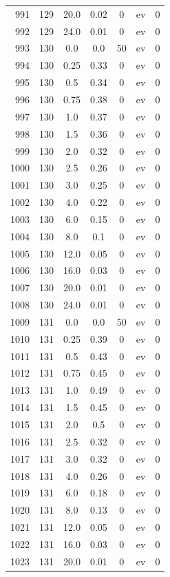 \documentclass[12pt,a4paper]{article}
\begin{document}
\begin{tabular}{r|cccccc}
	991 & 129 & 20.0 & 0.02 & 0 & ev & 0 \\
	992 & 129 & 24.0 & 0.01 & 0 & ev & 0 \\
	993 & 130 & 0.0 & 0.0 & 50 & ev & 0 \\
	994 & 130 & 0.25 & 0.33 & 0 & ev & 0 \\
	995 & 130 & 0.5 & 0.34 & 0 & ev & 0 \\
	996 & 130 & 0.75 & 0.38 & 0 & ev & 0 \\
	997 & 130 & 1.0 & 0.37 & 0 & ev & 0 \\
	998 & 130 & 1.5 & 0.36 & 0 & ev & 0 \\
	999 & 130 & 2.0 & 0.32 & 0 & ev & 0 \\
	1000 & 130 & 2.5 & 0.26 & 0 & ev & 0 \\
	1001 & 130 & 3.0 & 0.25 & 0 & ev & 0 \\
	1002 & 130 & 4.0 & 0.22 & 0 & ev & 0 \\
	1003 & 130 & 6.0 & 0.15 & 0 & ev & 0 \\
	1004 & 130 & 8.0 & 0.1 & 0 & ev & 0 \\
	1005 & 130 & 12.0 & 0.05 & 0 & ev & 0 \\
	1006 & 130 & 16.0 & 0.03 & 0 & ev & 0 \\
	1007 & 130 & 20.0 & 0.01 & 0 & ev & 0 \\
	1008 & 130 & 24.0 & 0.01 & 0 & ev & 0 \\
	1009 & 131 & 0.0 & 0.0 & 50 & ev & 0 \\
	1010 & 131 & 0.25 & 0.39 & 0 & ev & 0 \\
	1011 & 131 & 0.5 & 0.43 & 0 & ev & 0 \\
	1012 & 131 & 0.75 & 0.45 & 0 & ev & 0 \\
	1013 & 131 & 1.0 & 0.49 & 0 & ev & 0 \\
	1014 & 131 & 1.5 & 0.45 & 0 & ev & 0 \\
	1015 & 131 & 2.0 & 0.5 & 0 & ev & 0 \\
	1016 & 131 & 2.5 & 0.32 & 0 & ev & 0 \\
	1017 & 131 & 3.0 & 0.32 & 0 & ev & 0 \\
	1018 & 131 & 4.0 & 0.26 & 0 & ev & 0 \\
	1019 & 131 & 6.0 & 0.18 & 0 & ev & 0 \\
	1020 & 131 & 8.0 & 0.13 & 0 & ev & 0 \\
	1021 & 131 & 12.0 & 0.05 & 0 & ev & 0 \\
	1022 & 131 & 16.0 & 0.03 & 0 & ev & 0 \\
	1023 & 131 & 20.0 & 0.01 & 0 & ev & 0 \\

\end{tabular}
\end{document}
